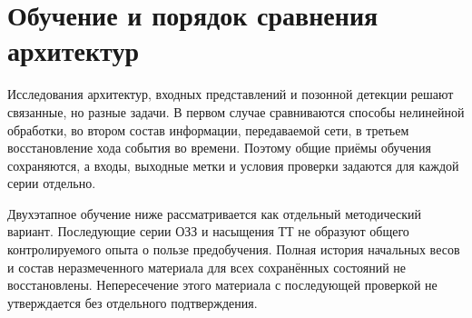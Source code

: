 \section{Обучение и порядок сравнения архитектур}
\label{sec:ch4_training_protocol}

{}

{}

Исследования архитектур, входных представлений и позонной
детекции решают связанные, но разные задачи.
В первом случае сравниваются способы нелинейной обработки,
во втором состав информации, передаваемой сети,
в третьем восстановление хода события во времени.
Поэтому общие приёмы обучения сохраняются,
а входы, выходные метки и условия проверки задаются
для каждой серии отдельно.

Двухэтапное обучение ниже рассматривается как отдельный
методический вариант. Последующие серии ОЗЗ и насыщения ТТ
не образуют общего контролируемого опыта о пользе предобучения.
Полная история начальных весов и состав неразмеченного
материала для всех сохранённых состояний не восстановлены.
Непересечение этого материала с последующей проверкой
не утверждается без отдельного подтверждения.

